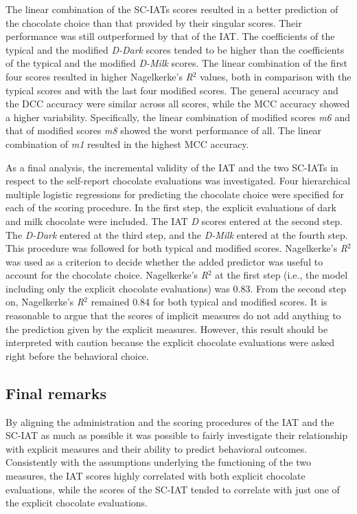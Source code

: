 \documentclass[12pt]{book}
\begin{document}
The linear combination of the SC-IATs scores resulted in a better prediction of the chocolate choice than that provided by their singular scores. Their performance was still outperformed by that of the IAT.
The coefficients of the typical and the modified \emph{D-Dark} scores tended to be higher than the coefficients of the typical and the modified \emph{D-Milk} scores. 
The linear combination of the first four scores resulted in higher Nagelkerke's \emph{R}$^2$ values, both in comparison with the typical scores and with the last four modified scores. 
The general accuracy and the DCC accuracy were similar across all scores, while the MCC accuracy showed a higher variability. Specifically, the linear combination of modified scores \emph{m6} and that of modified scores \emph{m8} showed the worst performance of all. The linear combination of \emph{m1} resulted in the highest MCC accuracy. 

As a final analysis, the incremental validity of the IAT and the two SC-IATs in respect to the self-report chocolate evaluations was investigated. 
Four hierarchical multiple logistic regressions for predicting the chocolate choice were specified for each of the scoring procedure. In the first step, the explicit evaluations of dark and milk chocolate were included. 
The IAT \emph{D} scores entered at the second step. The \emph{D-Dark} entered at the third step, and the \emph{D-Milk} entered at the fourth step. 
This procedure was followed for both typical and modified scores. Nagelkerke’s \emph{R}$^2$ was used as a criterion to decide whether the added predictor was useful to account for the chocolate choice. 
Nagelkerke’s \emph{R}$^2$ at the first step (i.e., the model including only the explicit chocolate evaluations) was 0.83. From the second step on, Nagelkerke’s \emph{R}$^2$ remained 0.84 for both typical and modified scores. 
It is reasonable to argue that the scores of implicit measures do not add anything to the prediction given by the explicit measures. However, this result should be interpreted with caution because the explicit chocolate evaluations were asked right before the behavioral choice.

\subsection{Final remarks}
By aligning the administration and the scoring procedures of the IAT and the SC-IAT as much as possible it was possible to fairly investigate their relationship with explicit measures and their ability to predict behavioral outcomes.
Consistently with the assumptions underlying the functioning of the two measures, the IAT scores highly correlated with both explicit chocolate evaluations, while the scores of the SC-IAT tended to correlate with just one of the explicit chocolate evaluations.
\end{document}
